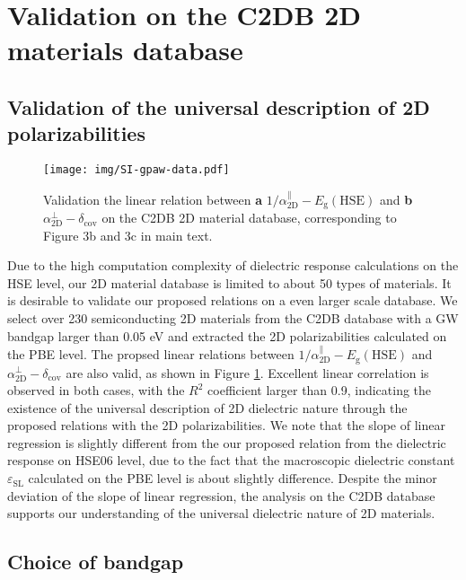 \documentclass[manuscript=suppinfo,email=true,hyperref=true,keywords=false]{achemso}
\begin{document}
\section{Validation on the C2DB 2D materials database}
\subsection{Validation of the universal description of 2D polarizabilities}
\label{sec:gpaw-1}

\begin{figure}[htbp]
  \centering
  \texttt{[image: img/SI-gpaw-data.pdf]}
  \caption{Validation the linear relation between \textbf{a}
    $1/\alpha_{\mathrm{2D}}^{\parallel}-E_{\mathrm{g}}(\mathrm{HSE})$ and \textbf{b}
    $\alpha_{\mathrm{2D}}^{\perp}-\delta_{\mathrm{cov}}$ on the C2DB 2D material
    database, corresponding to Figure 3b and 3c in main text.}
  \label{fig:gpaw-alpha-relation}
\end{figure}

Due to the high computation complexity of dielectric response
calculations on the HSE level, our 2D material database is limited to
about 50 types of materials. It is desirable to validate our proposed
relations on a even larger scale database. We select over 230
semiconducting 2D materials from the C2DB database with a GW bandgap
larger than 0.05 eV and extracted the 2D polarizabilities calculated
on the PBE level. The propsed linear relations between
$1/\alpha_{\mathrm{2D}}^{\parallel}-E_{\mathrm{g}}(\mathrm{HSE})$ and
$\alpha_{\mathrm{2D}}^{\perp}-\delta_{\mathrm{cov}}$ are also valid,
as shown in Figure \ref{fig:gpaw-alpha-relation}. Excellent linear
correlation is observed in both cases, with the $R^{2}$ coefficient
larger than 0.9, indicating the existence of the universal description
of 2D dielectric nature through the proposed relations with the 2D
polarizabilities. We note that the slope of linear regression is
slightly different from the our proposed relation from the dielectric
response on HSE06 level, due to the fact that the macroscopic
dielectric constant $\varepsilon_{\mathrm{SL}}$ calculated on the PBE
level is about slightly difference. Despite the minor deviation of the
slope of linear regression, the analysis on the C2DB database supports
our understanding of the universal dielectric nature of 2D materials.

\subsection{Choice of bandgap}
\label{sec:gpaw-2}
\end{document}
